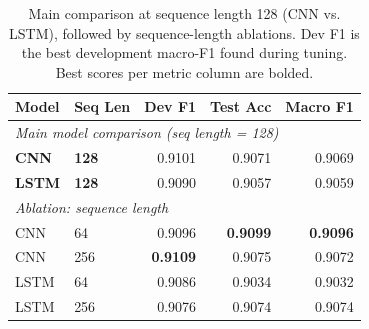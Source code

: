 \begin{table}[h]
\centering
\small
\begin{tabular}{llrrr}
\toprule
\textbf{Model} & \textbf{Seq Len} & \textbf{Dev F1} & \textbf{Test Acc} & \textbf{Macro F1} \\
\midrule
\multicolumn{5}{l}{\textit{Main model comparison (seq length = 128)}} \\
\textbf{CNN} & \textbf{128} & 0.9101 & 0.9071 & 0.9069 \\
\textbf{LSTM} & \textbf{128} & 0.9090 & 0.9057 & 0.9059 \\
\midrule
\multicolumn{5}{l}{\textit{Ablation: sequence length}} \\
CNN & 64 & 0.9096 & \textbf{0.9099} & \textbf{0.9096} \\
CNN & 256 & \textbf{0.9109} & 0.9075 & 0.9072 \\
LSTM & 64 & 0.9086 & 0.9034 & 0.9032 \\
LSTM & 256 & 0.9076 & 0.9074 & 0.9074 \\
\bottomrule
\end{tabular}
\caption{Main comparison at sequence length 128 (CNN vs. LSTM), followed by sequence-length ablations. Dev F1 is the best development macro-F1 found during tuning. Best scores per metric column are bolded.}
\label{tab:test_results}
\end{table}
